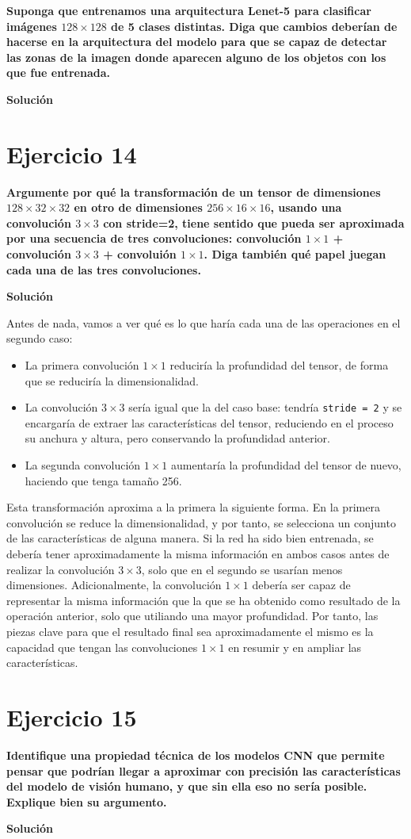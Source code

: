 \documentclass[11pt,a4paper]{article}
\newcommand{\answer}{\noindent\textbf{Solución}}
\newcommand{\question}[1]{\noindent\textbf{#1}}
\newcommand{\nonumsection}[1]{\section*{#1}\addcontentsline{toc}{section}{#1}}
\begin{document}
\question{Suponga que entrenamos una arquitectura Lenet-5 para clasificar
imágenes $128 \times 128$ de 5 clases distintas. Diga que cambios deberían de
hacerse en la arquitectura del modelo para que se capaz de detectar
las zonas de la imagen donde aparecen alguno de los objetos con los
que fue entrenada.}

\answer

\nonumsection{Ejercicio 14}

\question{Argumente por qué la transformación de un tensor de dimensiones
$128 \times 32 \times 32$ en otro de dimensiones $256 \times 16 \times 16$,
usando una convolución $3 \times 3$ con stride=2, tiene sentido que pueda
ser aproximada por una secuencia de tres convoluciones: convolución $1 \times 1$
+ convolución $3 \times 3$ + convoluión $1 \times 1$. Diga también qué papel
juegan cada una de las tres convoluciones.}

\answer

Antes de nada, vamos a ver qué es lo que haría cada una de las operaciones en el
segundo caso:

\begin{itemize}
  \item La primera convolución $1 \times 1$ reduciría la profundidad del tensor,
  de forma que se reduciría la dimensionalidad.
  \item La convolución $3 \times 3$  sería igual que la del caso base: tendría
  \texttt{stride = 2} y se encargaría de extraer las características del tensor,
  reduciendo en el proceso su anchura y altura, pero conservando la profundidad
  anterior.
  \item La segunda convolución $1 \times 1$ aumentaría la profundidad del tensor de
  nuevo, haciendo que tenga tamaño 256.
\end{itemize}

Esta transformación aproxima a la primera la siguiente forma. En la primera
convolución se reduce la dimensionalidad, y por tanto, se selecciona un conjunto
de las características de alguna manera. Si la red ha sido bien entrenada, se
debería tener aproximadamente la misma información en ambos casos antes de realizar
la convolución $3 \times 3$, solo que en el segundo se usarían menos dimensiones.
Adicionalmente, la convolución $1 \times 1$ debería ser capaz de representar
la misma información que la que se ha obtenido como resultado de la operación
anterior, solo que utiliando una mayor profundidad. Por tanto, las piezas
clave para que el resultado final sea aproximadamente el mismo es la capacidad
que tengan las convoluciones $1 \times 1$ en resumir y en ampliar las características.

\nonumsection{Ejercicio 15}

\question{Identifique una propiedad técnica de los modelos CNN que permite
pensar que podrían llegar a aproximar con precisión las
características del modelo de visión humano, y que sin ella eso no
sería posible. Explique bien su argumento.}

\answer

\newpage



\end{document}
